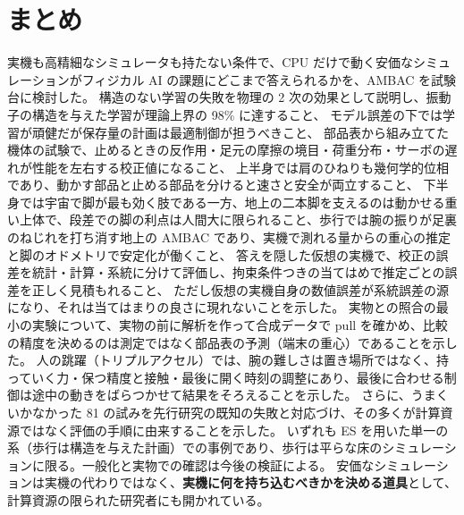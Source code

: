 \documentclass[paper=a4paper,fontsize=10pt,twocolumn,column_gap=2zw,line_length=24zw,number_of_lines=46,head_space=20mm]{jlreq}
\begin{document}
\section{まとめ}

実機も高精細なシミュレータも持たない条件で、CPU だけで動く安価なシミュレーションがフィジカル AI の課題にどこまで答えられるかを、AMBAC を試験台に検討した。
構造のない学習の失敗を物理の 2 次の効果として説明し、振動子の構造を与えた学習が理論上界の 98\% に達すること、
モデル誤差の下では学習が頑健だが保存量の計画は最適制御が担うべきこと、
部品表から組み立てた機体の試験で、止めるときの反作用・足元の摩擦の境目・荷重分布・サーボの遅れが性能を左右する校正値になること、
上半身では肩のひねりも幾何学的位相であり、動かす部品と止める部品を分けると速さと安全が両立すること、
下半身では宇宙で脚が最も効く肢である一方、地上の二本脚を支えるのは動かせる重い上体で、段差での脚の利点は人間大に限られること、歩行では腕の振りが足裏のねじれを打ち消す地上の AMBAC であり、実機で測れる量からの重心の推定と脚のオドメトリで安定化が働くこと、
答えを隠した仮想の実機で、校正の誤差を統計・計算・系統に分けて評価し、拘束条件つきの当てはめで推定ごとの誤差を正しく見積もれること、
ただし仮想の実機自身の数値誤差が系統誤差の源になり、それは当てはまりの良さに現れないことを示した。
実物との照合の最小の実験について、実物の前に解析を作って合成データで pull を確かめ、比較の精度を決めるのは測定ではなく部品表の予測（端末の重心）であることを示した。
人の跳躍（トリプルアクセル）では、腕の難しさは置き場所ではなく、持っていく力・保つ精度と接触・最後に開く時刻の調整にあり、最後に合わせる制御は途中の動きをばらつかせて結果をそろえることを示した。
さらに、うまくいかなかった 81 の試みを先行研究の既知の失敗と対応づけ、その多くが計算資源ではなく評価の手順に由来することを示した。
いずれも ES を用いた単一の系（歩行は構造を与えた計画）での事例であり、歩行は平らな床のシミュレーションに限る。一般化と実物での確認は今後の検証による。
安価なシミュレーションは実機の代わりではなく、\textbf{実機に何を持ち込むべきかを決める道具}として、計算資源の限られた研究者にも開かれている。

\appendix
\end{document}
